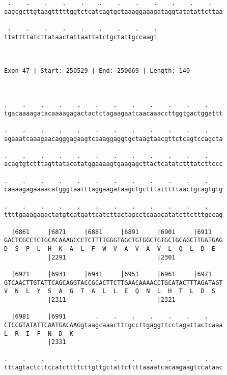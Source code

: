 \documentclass{article}
\begin{document}
\begin{Verbatim}
 .    .    .    .    .    .    .    .    .    .    .    .   
aagcgcttgtaagtttttggtctcatcagtgctaaaggaaagataggtatatattcttaa
                                                            
 .    .    .    .    .    .    .    .    .
ttattttatcttataactattaattatctgctattgccaagt
                                          
                                          
 
Exon 47 | Start: 250529 | End: 250669 | Length: 140



.    .    .    .    .    .    .    .    .    .    .    .    
tgacaaaagatacaaaagagactactctagaagaatcaacaaaccttggtgactggattt
                                                            
.    .    .    .    .    .    .    .    .    .    .    .    
agaaatcaaagaacagggagaagtcaaaggaggtgctaagtaacgttctcagtccagcta
                                                            
.    .    .    .    .    .    .    .    .    .    .    .    
acagtgtctttagttatacatatggaaaagtgaagagcttactcatatctttatcttccc
                                                            
.    .    .    .    .    .    .    .    .    .    .    .    
caaaagagaaaacatgggtaatttaggaagataagctgctttatttttaactgcagtgtg
                                                            
.    .    .    .    .    .    .    .    .    .    .    .    
ttttgaaagagactatgtcatgattcatcttactagcctcaaacatatcttctttgccag
                                                            
  |6861     |6871     |6881     |6891     |6901     |6911   
GACTCGCCTCTGCACAAAGCCCTCTTTTGGGTAGCTGTGGCTGTGCTGCAGCTTGATGAG
D  S  P  L  H  K  A  L  F  W  V  A  V  A  V  L  Q  L  D  E  
            |2291                         |2301             
  
  |6921     |6931     |6941     |6951     |6961     |6971   
GTCAACTTGTATTCAGCAGGTACCGCACTTCTTGAACAAAACCTGCATACTTTAGATAGT
V  N  L  Y  S  A  G  T  A  L  L  E  Q  N  L  H  T  L  D  S  
            |2311                         |2321             
  
  |6981     |6991        .    .    .    .    .    .    .    
CTCCGTATATTCAATGACAAGgtaagcaaactttgccttgaggttcctagattactcaaa
L  R  I  F  N  D  K                                         
            |2331                                           
  
.    .    .    .    .    .    .    .    .    .    .    .    
tttagtactcttccatcttttcttgttgctattcttttaaaatcacaagaagtccataac
                                                            

\end{Verbatim}
\end{document}
